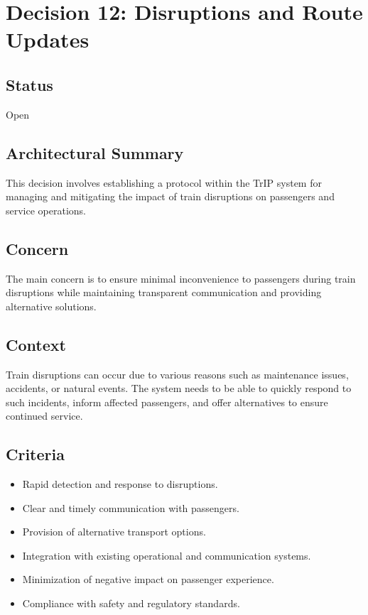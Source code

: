 \documentclass{article}
\begin{document}
\section*{Decision 12: Disruptions and Route Updates}

\subsection*{Status}
Open

\subsection*{Architectural Summary}
This decision involves establishing a protocol within the TrIP system for managing and mitigating the impact of train disruptions on passengers and service operations.

\subsection*{Concern}
The main concern is to ensure minimal inconvenience to passengers during train disruptions while maintaining transparent communication and providing alternative solutions.

\subsection*{Context}
Train disruptions can occur due to various reasons such as maintenance issues, accidents, or natural events. The system needs to be able to quickly respond to such incidents, inform affected passengers, and offer alternatives to ensure continued service.

\subsection*{Criteria}
\begin{itemize}
    \item Rapid detection and response to disruptions.
    \item Clear and timely communication with passengers.
    \item Provision of alternative transport options.
    \item Integration with existing operational and communication systems.
    \item Minimization of negative impact on passenger experience.
    \item Compliance with safety and regulatory standards.
\end{itemize}
\end{document}
